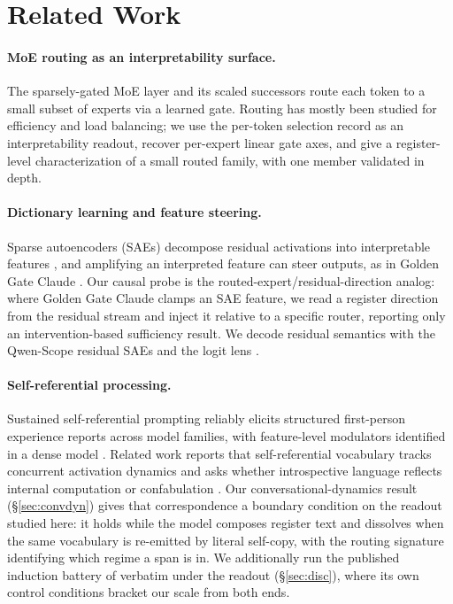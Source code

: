 \documentclass[10pt,a4paper,twocolumn]{article}
\begin{document}
\section{Related Work}

\paragraph{MoE routing as an interpretability surface.}
The sparsely-gated MoE layer \cite{shazeer2017} and its scaled successors
\cite{fedus2022,jiang2024} route each token to a small subset of experts via a
learned gate. Routing has mostly been studied for efficiency and load balancing;
we use the per-token selection record as an interpretability readout, recover
per-expert linear gate axes, and give a register-level characterization of a
small routed family, with one member validated in depth.

\paragraph{Dictionary learning and feature steering.}
Sparse autoencoders (SAEs) decompose residual activations into interpretable
features \cite{bricken2023,cunningham2023,templeton2024}, and amplifying an
interpreted feature can steer outputs, as in Golden Gate Claude
\cite{ggc2024}. Our causal probe is the routed-expert/residual-direction analog:
where Golden Gate Claude clamps an SAE feature, we read a register direction from
the residual stream and inject it relative to a specific router, reporting only an
intervention-based sufficiency result. We decode residual semantics with the
Qwen-Scope residual SAEs \cite{qwenscope} and the logit lens \cite{logitlens}.

\paragraph{Self-referential processing.}
Sustained self-referential prompting reliably elicits structured first-person
experience reports across model families, with feature-level modulators
identified in a dense model \cite{berg2025}. Related work reports that
self-referential vocabulary tracks concurrent activation dynamics and asks
whether introspective language reflects internal computation or confabulation
\cite{dadfar2026}. Our conversational-dynamics result
(\S\ref{sec:convdyn}) gives that correspondence a boundary condition on the
readout studied here: it holds while the model composes register text and
dissolves when the same vocabulary is re-emitted by literal self-copy, with the
routing signature identifying which regime a span is in. We additionally run
the published induction battery of \cite{berg2025} verbatim under the readout
(\S\ref{sec:disc}), where its own control conditions bracket our scale from
both ends.
\end{document}
